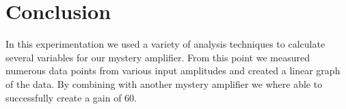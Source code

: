 \documentclass[12pt]{article}
\begin{document}
\newpage


\section{Conclusion}

In this experimentation we used a variety of analysis techniques to calculate several variables for our mystery amplifier. From this point we measured numerous data points from various input amplitudes and created a linear graph of the data. By combining with another mystery amplifier we where able to successfully create a gain of 60.
\end{document}
